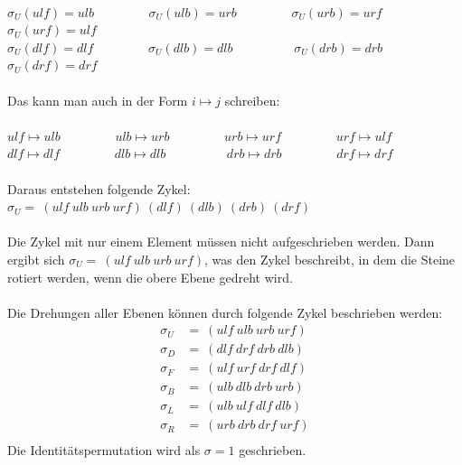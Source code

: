 \documentclass[12pt,a4paper, usenames, dvipsnames]{article}
\begin{document}
\ \\
$\sigma_U(ulf)=ulb$ \ \ \ \ \ \ \ \ $\sigma_U(ulb)=urb$ \ \ \ \ \ \ \ \ $\sigma_U(urb)=urf$ \ \ \ \ \ \ \ \ $\sigma_U(urf)=ulf$ \\
$\sigma_U(dlf)=dlf$ \ \ \ \ \ \ \ \ $\sigma_U(dlb)=dlb$ \ \ \ \ \ \ \ \ \ $\sigma_U(drb)=drb$ \ \ \ \ \ \ \ \ $\sigma_U(drf)=drf$ \\
\\
Das kann man auch in der Form $i \mapsto j$ schreiben: \\
\\
$ulf \mapsto ulb$ \ \ \ \ \ \ \ \ $ulb \mapsto urb$ \ \ \ \ \ \ \ \ $urb \mapsto urf$ \ \ \ \ \ \ \ \ $urf \mapsto ulf$ \\
$dlf \mapsto dlf$ \ \ \ \ \ \ \ \ $dlb \mapsto dlb$ \ \ \ \ \ \ \ \ \ $drb \mapsto drb$ \ \ \ \ \ \ \ \ $drf \mapsto drf$ \\
\\
Daraus entstehen folgende Zykel: $\sigma_U = \ (ulf \ ulb \ urb \ urf)\ (dlf)\ (dlb)\ (drb)\ (drf)$ \\ \\
Die Zykel mit nur einem Element müssen nicht aufgeschrieben werden. Dann ergibt sich $\sigma_U = \ (ulf \ ulb \ urb \ urf)$, was den Zykel beschreibt, in dem die Steine rotiert werden, wenn die obere Ebene gedreht wird. \\
\\
Die Drehungen aller Ebenen können durch folgende Zykel beschrieben werden: \\
\begin{align*}
\sigma_U & =\ (ulf \ ulb \ urb \ urf) \\
\sigma_D & =\ (dlf \ drf \ drb \ dlb) \\
\sigma_F & =\ (ulf \ urf \ drf \ dlf) \\
\sigma_B & =\ (ulb \ dlb \ drb \ urb) \\
\sigma_L & =\ (ulb \ ulf \ dlf \ dlb) \\
\sigma_R & =\ (urb \ drb \ drf \ urf) \\
\end{align*}
Die Identitätspermutation wird als $\sigma = 1$ geschrieben.










\end{document}
